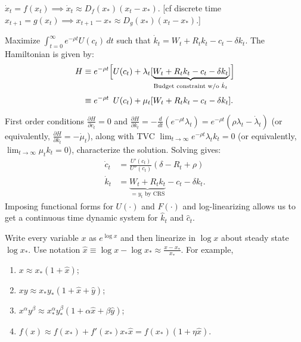 \documentclass[8pt,letterpaper, landscape]{extarticle} %
\renewcommand{\ln}{\log}
\begin{document}
\begin{multicols}{3}
\begin{description}
 $ \dot{x}_t = f(x_t) \implies \dot{x}_t \approx D_f (x_*) (x_t - x_*) $. [cf discrete time $ x_{t+1} = g(x_t) \implies x_{t+1} - x_* \approx D_g (x_*) (x_t - x_*) $.]

 Maximize $ \int_{t=0}^{\infty} e^{- \rho t} U(c_t) \, dt $ such that $ \dot{k}_t = W_t + R_t k_t - c_t - \delta k_t $. The Hamiltonian is given by:
\begin{align*}
H &\equiv e^{-\rho t} \Bigl [ U(c_t) + \lambda_t [ \underbrace{W_t + R_t k_t - c_t - \delta k_t}_\text{Budget constraint w/o $ \dot{k}_t $} ] \Bigr ] \\
&\equiv e^{-\rho t} \phantom{\Bigl [} U(c_t) + \mu_t [ W_t + R_t k_t - c_t - \delta k_t ] .
\end{align*}
First order conditions $ \tfrac{\partial H}{\partial c_t} = 0 $ and $ \tfrac{\partial H}{\partial k_t} = - \tfrac{d}{dt} (e^{- \rho t} \lambda_t) = e^{- \rho t}(\rho \lambda_t - \dot{\lambda}_t) $ (or equivalently, $ \tfrac{\partial H}{\partial k_t} = - \dot{\mu}_t $), along with TVC $ \lim_{t \to \infty} e^{- \rho t} \lambda_t k_t = 0  $ (or equivalently, $ \lim_{t \to \infty} \mu_t k_t = 0 $), characterize the solution. Solving gives:
\begin{align*}
\dot{c}_t &= \tfrac{U'(c_t)}{U''(c_t)} (\delta - R_t + \rho) \\
\dot{k}_t &= \underbrace{W_t + R_t k_t}_{= y_t \text{ by CRS}} - c_t - \delta k_t.
\end{align*}
Imposing functional forms for $ U(\cdot) $ and $ F(\cdot) $ and log-linearizing allows us to get a continuous time dynamic system for $ \hat{k}_t $ and  $ \hat{c}_t $.

 Write every variable $ x $ as $ e^{\ln x} $ and then linearize in $ \ln x $ about steady state $ \ln x_* $. Use notation $ \hat{x} \equiv \ln x - \ln x_* \approx \frac{x - x_*}{x_*} $. For example,
\begin{enumerate}
\item $ x \approx x_* (1 + \hat{x}) $;
\item $ xy \approx x_* y_* (1 + \hat{x} + \hat{y}) $;
\item $ x^\alpha y^\beta \approx x_*^\alpha y_*^\beta (1 + \alpha \hat{x} + \beta \hat{y}) $;
\item $ f(x) \approx f(x_*) + f'(x_*) x_* \hat{x} = f(x_*) (1 + \eta \hat{x}) $.
\end{enumerate}


\end{description}
\end{multicols}
\end{document}
